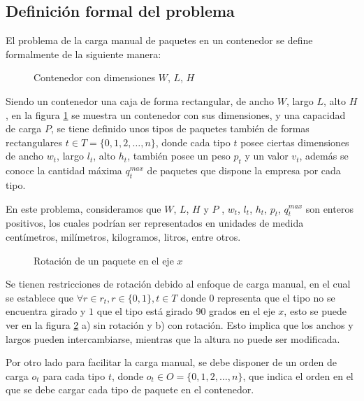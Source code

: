 \subsection{Definición formal del problema}

El problema de la carga manual de paquetes en un contenedor se define formalmente de la siguiente manera:

\begin{figure}[H]
    \centering
    
    \caption{Contenedor con dimensiones $W$, $L$, $H$}
    \label{fig:container}
\end{figure}

Siendo un contenedor una caja de forma rectangular, de ancho $W$, largo $L$, alto $H$, en la figura \ref{fig:container} se muestra un contenedor con sus dimensiones, y una capacidad de carga $P$, se tiene definido unos tipos de paquetes también de formas rectangulares $t \in T = \{0, 1, 2, \ldots, n\}$, donde cada tipo $t$ posee ciertas dimensiones de ancho $w_t$, largo $l_t$, alto $h_t$, también posee un peso $p_t$ y un valor $v_t$, además se conoce la cantidad máxima $q^{max}_t$ de paquetes que dispone la empresa por cada tipo.

En este problema, consideramos que $W$, $L$, $H$ y $P$ , $w_t$, $l_t$, $h_t$, $p_t$, $q^{max}_t$ son enteros positivos, los cuales podrían ser representados en unidades de medida centímetros, milímetros, kilogramos, litros, entre otros.

\begin{figure}[H]
    \centering
    
    \caption{Rotación de un paquete en el eje $x$}
    \label{fig:rotation}
\end{figure}

Se tienen restricciones de rotación debido al enfoque de carga manual, en el cual se establece que $\forall r \in r_t, r \in \{0, 1\}, t \in T$ donde $0$ representa que el tipo no se encuentra girado y $1$ que el tipo está girado 90 grados en el eje $x$, esto se puede ver en la figura \ref{fig:rotation} a) sin rotación y b) con rotación. Esto implica que los anchos y largos pueden intercambiarse, mientras que la altura no puede ser modificada.

Por otro lado para facilitar la carga manual, se debe disponer de un orden de carga $o_t$ para cada tipo $t$, donde $o_t \in O = \{0, 1, 2, \ldots, n\}$, que indica el orden en el que se debe cargar cada tipo de paquete en el contenedor.

